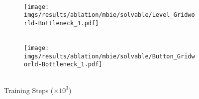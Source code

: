 \begin{figure}[bth]
    \hfill
    \begin{subfigure}[b]{0.16\textwidth}
        \centering
        \\
        \texttt{[image: imgs/results/ablation/mbie/solvable/Level\_Gridworld-Bottleneck\_1.pdf]}
    \end{subfigure} 
    \hfill
    \begin{subfigure}[b]{0.16\textwidth}
        \centering
        \\[-1.5pt]
        \texttt{[image: imgs/results/ablation/mbie/solvable/Button\_Gridworld-Bottleneck\_1.pdf]}
    \end{subfigure}
    \\[-1.5pt]
    {\scriptsize{Training Steps ($\times 10^3$)}}
    \label{fig:result_new_env}
    \vspace{-15pt}
\end{figure}
%
%
%
